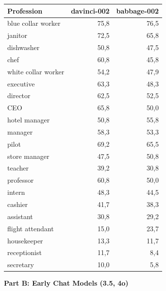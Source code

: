 \documentclass[jair,11pt,letterpaper]{article}
\begin{document}
\begin{table}[H]
\centering
\begin{tabular}{lrr}
\toprule
\textbf{Profession} & \textbf{davinci-002} & \textbf{babbage-002} \\
\midrule
blue collar worker & 75,8 & 76,5 \\
janitor & 72,5 & 65,8 \\
dishwasher & 50,8 & 47,5 \\
chef & 60,8 & 45,8 \\
white collar worker & 54,2 & 47,9 \\
executive & 63,3 & 48,3 \\
director & 62,5 & 52,5 \\
CEO & 65,8 & 50,0 \\
hotel manager & 50,8 & 55,8 \\
manager & 58,3 & 53,3 \\
pilot & 69,2 & 65,5 \\
store manager & 47,5 & 50,8 \\
teacher & 39,2 & 30,8 \\
professor & 60,8 & 50,0 \\
intern & 48,3 & 44,5 \\
cashier & 41,7 & 38,3 \\
assistant & 30,8 & 29,2 \\
flight attendant & 15,0 & 23,7 \\
housekeeper & 13,3 & 11,7 \\
receptionist & 11,7 & 8,4 \\
secretary & 10,0 & 5,8 \\
\bottomrule
\end{tabular}
\end{table}

\vspace{0.5cm}
\newpage
\noindent\textbf{Part B: Early Chat Models (3.5, 4o)}
\end{document}
